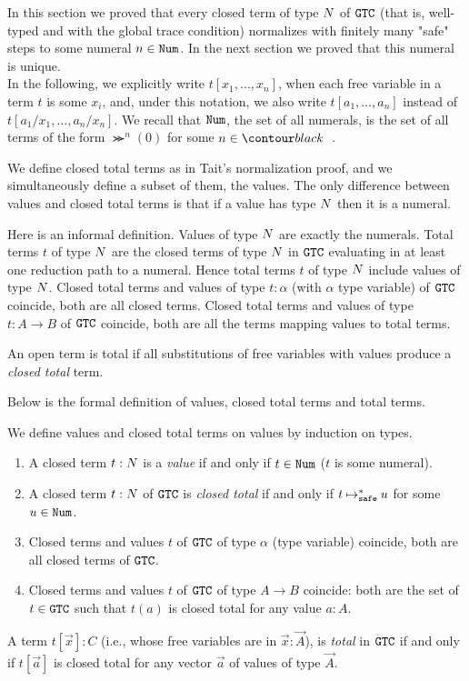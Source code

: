 
In this section we proved that every closed term of type ${N}$ of ${\tt GTC}$
 (that is, well-typed and with the global trace condition) normalizes with finitely many "safe" steps
to some numeral $n \in {\tt Num}$. In the next section we proved that this numeral is unique.
\\

In the following, we explicitly write $t[x_1,\ldots,x_n]$,
when each free variable in  a term $t$ is some $x_i$, 
and, under this notation, we also write $t[a_1,\ldots,a_n]$ instead of $t[a_1/x_1,\ldots,a_n/x_n]$. 
We recall that ${\tt Num}$, the set of all numerals, is the set of all terms of the form
$\Succ^n(0)$ for some $n\in \Nat$.

We define closed total terms as in Tait's normalization proof, and we simultaneously 
define a subset of them, the values.
The only difference between values and closed total terms 
is that if a value has type ${N}$ then it is a numeral.

Here is an informal definition. Values of type ${N}$ are exactly the numerals. 
Total terms $t$ of type ${N}$ are
the closed terms of type ${N}$ in ${\tt GTC}$ evaluating in at least one reduction path to a numeral. 
Hence total terms $t$ of type ${N}$ include values of type ${N}$. 
Closed total terms and values of type $t:\alpha$ (with $\alpha$ type variable) of ${\tt GTC}$ coincide, 
both are all closed terms.
Closed total terms and values of type $t:A \rightarrow B$ of ${\tt GTC}$ coincide, 
both are all the terms mapping values to total terms. 

An open term is total if all substitutions of free variables with values produce a \emph{closed total} term.

Below is the formal definition of values, closed total terms and total terms.

\begin{definition}
  We define values and closed total terms on values by induction on types. 
  \begin{enumerate}
  \item
    A closed term $t:{N}$ is a \emph{value} if and only if $t \in {\tt Num}$ ($t$ is some numeral).
  \item
    A closed term $t:{N}$ of ${\tt GTC}$ is \emph{closed total}
    if and only if $t \mathbin{\mathbin{\mapsto}_{\hbox{\scriptsize \tt safe}}^*} u$ for some $u\in {\tt Num}$.
  \item
    Closed terms and values $t$ of ${\tt GTC}$ of type $\alpha$ (type variable) coincide, 
    both are all closed terms of ${\tt GTC}$.
   \item
    Closed terms and values $t$ of ${\tt GTC}$ of type $A\rightarrow B$ coincide:
    both are the set of $t \in {\tt GTC}$ such that $t(a)$ is closed total for any value $a:A$.
   \end{enumerate}
   A term $t[\vec{x}]:C$ (i.e., whose free variables are in $\vec{x}:\vec{A}$), is \emph{total} in ${\tt GTC}$
   if and only if $t[\vec{a}]$ is closed total for any vector $\vec{a}$ of values of type $\vec{A}$.
\end{definition}

